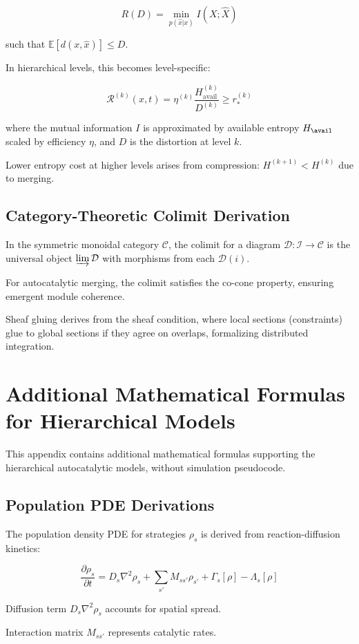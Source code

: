 \documentclass{book}
\begin{document}
\[R(D) = \min_{p(\hat{x}|x)} I(X; \hat{X})\]

such that $\mathbb{E}[d(x, \hat{x})] \le D$.

In hierarchical levels, this becomes level-specific:

\[ \mathcal{R}^{(k)}(x,t) = \eta^{(k)} \frac{H^{(k)}_{\mathrm{avail}}}{D^{(k)}} \ge r_\ast^{(k)} \]

where the mutual information $I$ is approximated by available entropy $H_{\avail}$ scaled by efficiency $\eta$, and $D$ is the distortion at level $k$.

Lower entropy cost at higher levels arises from compression: $H^{(k+1)} < H^{(k)}$ due to merging.

\section{Category-Theoretic Colimit Derivation}
In the symmetric monoidal category $\mathcal{C}$, the colimit for a diagram $\mathcal{D}: \mathcal{I} \to \mathcal{C}$ is the universal object $\varinjlim \mathcal{D}$ with morphisms from each $\mathcal{D}(i)$.

For autocatalytic merging, the colimit satisfies the co-cone property, ensuring emergent module coherence.

Sheaf gluing derives from the sheaf condition, where local sections (constraints) glue to global sections if they agree on overlaps, formalizing distributed integration.

\chapter{Additional Mathematical Formulas for Hierarchical Models}
This appendix contains additional mathematical formulas supporting the hierarchical autocatalytic models, without simulation pseudocode.

\section{Population PDE Derivations}
The population density PDE for strategies $\rho_s$ is derived from reaction-diffusion kinetics:

\[\frac{\partial \rho_s}{\partial t} = D_s \nabla^2 \rho_s + \sum_{s'} M_{ss'} \rho_{s'} + \Gamma_s[\rho] - \Lambda_s[\rho]\]

Diffusion term $D_s \nabla^2 \rho_s$ accounts for spatial spread.

Interaction matrix $M_{ss'}$ represents catalytic rates.
\end{document}
